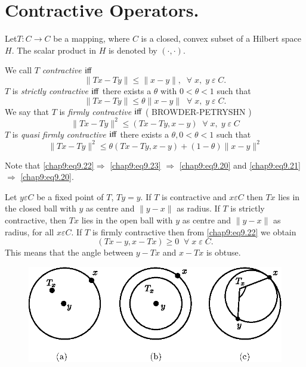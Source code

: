 \section{Contractive Operators.}\label{chap9:sec3}
Let\pageoriginale $T:C\to C$ be a mapping, where $C$ is a closed,
convex subset of a Hilbert space $H$. The scalar product in $H$ is
denoted by $(\cdotp,\cdotp)$. 

We call $T$ \emph{contractive} $\operatorname{iff}$ 
\begin{equation}\label{chap9:eq9.20}
\parallel Tx-Ty\parallel \leq \parallel x-y\parallel, \; \; \forall \;x,
\;y \; \varepsilon \;C.
\end{equation}
$T$ is \emph{strictly contractive} $\operatorname{iff}$ there exists a $\theta$ with
$0<\theta <1$ such that 
\begin{equation}\label{chap9:eq9.21}
\parallel Tx-Ty\parallel \leq \theta\parallel x-y\parallel \; \; \forall
\;x, \;y \;\varepsilon \; C.
\end{equation}
We say that $T$ is \emph{firmly contractive} $\operatorname{iff}$ (\cf
BROWDER-PETRYSHN \cite{key8})
\begin{equation}\label{chap9:eq9.22}
\parallel Tx-Ty\parallel^2 \leq (Tx-Ty, x-y)\; \; \forall \;x, \;y
\;\varepsilon \;C
\end{equation}
$T$ is \emph{quasi firmly contractive} $\operatorname{iff}$ there exists a $\theta,
0<\theta <1$ such that 
\begin{equation}\label{chap9:eq9.23}
\parallel Tx-Ty\parallel^2 \leq \theta(Tx-Ty, x-y)+(1-\theta)\parallel
x-y\parallel^2 
\end{equation}

Note that \eqref{chap9:eq9.22}$\Rightarrow$ \eqref{chap9:eq9.23}
$\Rightarrow$ \eqref{chap9:eq9.20} and \eqref{chap9:eq9.21}$\Rightarrow$
\eqref{chap9:eq9.20}. 

\medskip
{}
 Let $y\varepsilon C$ be a fixed point of $T$, \ie
$Ty=y$. If $T$ is contractive and $x\varepsilon C$ then
$Tx$ lies in the closed ball with $y$ as centre and
$\parallel y-x\parallel$ as radius. If $T$ is strictly
contractive, then $Tx$ lies in the open ball with $y$ as centre and
$\parallel y-x\parallel$ as radius, for all $x\varepsilon C$. If $T$
is firmly contractive then from \eqref{chap9:eq9.22} we obtain 
$$
(Tx-y,x-Tx)\geq 0\; \; \forall \;x \;\varepsilon \;C.
$$\pageoriginale
This means that the angle between $y-Tx$ and $x-Tx$ is obtuse.
\begin{figure}[H]
\centering
\includegraphics{figure/addfig9.1.eps}
\caption{}\label{fig9.1}
\end{figure}

